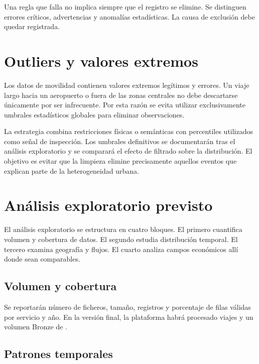 Una regla que falla no implica siempre que el registro se elimine. Se distinguen errores críticos, advertencias y anomalías estadísticas. La causa de exclusión debe quedar registrada.

\section{Outliers y valores extremos}

Los datos de movilidad contienen valores extremos legítimos y errores. Un viaje largo hacia un aeropuerto o fuera de las zonas centrales no debe descartarse únicamente por ser infrecuente. Por esta razón se evita utilizar exclusivamente umbrales estadísticos globales para eliminar observaciones.

La estrategia combina restricciones físicas o semánticas con percentiles utilizados como señal de inspección. Los umbrales definitivos se documentarán tras el análisis exploratorio y se comparará el efecto de filtrado sobre la distribución. El objetivo es evitar que la limpieza elimine precisamente aquellos eventos que explican parte de la heterogeneidad urbana.

\section{Análisis exploratorio previsto}

El análisis exploratorio se estructura en cuatro bloques. El primero cuantifica volumen y cobertura de datos. El segundo estudia distribución temporal. El tercero examina geografía y flujos. El cuarto analiza campos económicos allí donde sean comparables.

\subsection{Volumen y cobertura}

Se reportarán número de ficheros, tamaño, registros y porcentaje de filas válidas por servicio y año. En la versión final, la plataforma habrá procesado \TotalTrips{} viajes y un volumen Bronze de \TotalBronzeGB{}.


\subsection{Patrones temporales}

